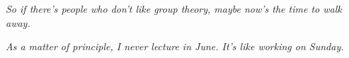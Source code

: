 
\textit{So if there's people who don't like group theory, maybe now's the time
  to walk away.}

\textit{As a matter of principle, I never lecture in June. It's like working on
  Sunday.}


{

\newcommand{\Cyc}{\operatorname{Cyc}}
\newcommand{\Dih}{\operatorname{Dih}}



}
